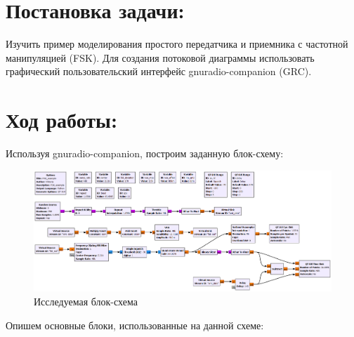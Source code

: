 \documentclass[12pt]{article}
\begin{document}
\begin{titlepage}
    
\end{titlepage}

\tableofcontents
\pagebreak

\section{Постановка задачи:}

Изучить пример моделирования простого передатчика и приемника с частотной манипуляцией (FSK).  Для создания потоковой диаграммы использовать графический пользовательский интерфейс gnuradio-companion (GRC). 

\section{Ход работы:}

Используя gnuradio-companion, построим заданную блок-схему:
\begin{figure}[h]
    \centering
    \includegraphics[width=1\textwidth]{pics/a0000-img001.png}
    \caption{Исследуемая блок-схема}
\end{figure}
Опишем основные блоки, использованные на данной схеме:
\end{document}
